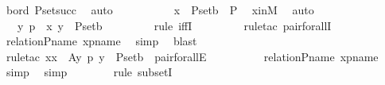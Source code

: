 \begin{isabellebody}
\ bord\ P{\isacharunderscore}{\kern0pt}set{\isacharunderscore}{\kern0pt}succ\ \isamarkupfalse%
\ auto\ \isanewline
\ \ \ \ \isamarkupfalse%
\ \isamarkupfalse%
\ {\isachardoublequoteopen}{\isachardot}{\kern0pt}{\isachardot}{\kern0pt}{\isachardot}{\kern0pt}\ {\isasymlongleftrightarrow}\ x\ {\isasymsubseteq}\ P{\isacharunderscore}{\kern0pt}set{\isacharparenleft}{\kern0pt}b{\isacharparenright}{\kern0pt}\ {\isasymtimes}\ P{\isachardoublequoteclose}\ \isamarkupfalse%
\ xinM\ \isamarkupfalse%
\ auto\ \isanewline
\ \ \ \ \isamarkupfalse%
\ \isamarkupfalse%
\ {\isachardoublequoteopen}{\isachardot}{\kern0pt}{\isachardot}{\kern0pt}{\isachardot}{\kern0pt}\ {\isasymlongleftrightarrow}\ {\isacharparenleft}{\kern0pt}{\isasymforall}{\isacharless}{\kern0pt}y{\isacharcomma}{\kern0pt}\ p{\isachargreater}{\kern0pt}\ {\isasymin}\ x{\isachardot}{\kern0pt}\ y\ {\isasymin}\ P{\isacharunderscore}{\kern0pt}set{\isacharparenleft}{\kern0pt}b{\isacharparenright}{\kern0pt}{\isacharparenright}{\kern0pt}{\isachardoublequoteclose}\ \isanewline
\ \ \ \ \ \ \isamarkupfalse%
\ {\isacharparenleft}{\kern0pt}rule\ iffI{\isacharparenright}{\kern0pt}\ \isanewline
\ \ \ \ \ \ \isamarkupfalse%
\ {\isacharparenleft}{\kern0pt}rule{\isacharunderscore}{\kern0pt}tac\ pair{\isacharunderscore}{\kern0pt}forallI{\isacharparenright}{\kern0pt}\ \isamarkupfalse%
\ relation{\isacharunderscore}{\kern0pt}P{\isacharunderscore}{\kern0pt}name\ xpname\ \isamarkupfalse%
\ simp\ \isamarkupfalse%
\ blast\ \isanewline
\ \ \ \ \ \ \isamarkupfalse%
\ {\isacharparenleft}{\kern0pt}rule{\isacharunderscore}{\kern0pt}tac\ x{\isacharequal}{\kern0pt}x\ \ A{\isacharequal}{\kern0pt}{\isachardoublequoteopen}{\isasymlambda}y\ p{\isachardot}{\kern0pt}\ y\ {\isasymin}\ P{\isacharunderscore}{\kern0pt}set{\isacharparenleft}{\kern0pt}b{\isacharparenright}{\kern0pt}{\isachardoublequoteclose}\ \ pair{\isacharunderscore}{\kern0pt}forallE{\isacharparenright}{\kern0pt}\ \ \isanewline
\ \ \ \ \ \ \isamarkupfalse%
\ relation{\isacharunderscore}{\kern0pt}P{\isacharunderscore}{\kern0pt}name\ xpname\ \isamarkupfalse%
\ simp\ \isamarkupfalse%
\ simp\isanewline
\ \ \ \ \ \ \isamarkupfalse%
\ {\isacharparenleft}{\kern0pt}rule\ subsetI{\isacharparenright}{\kern0pt}\isanewline
\ \ \ \ \isamarkupfalse%
\ {\isacharminus}{\kern0pt}\ \isanewline

\end{isabellebody}
